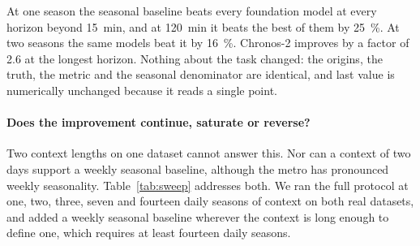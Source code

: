 \documentclass[utf8]{FrontiersinHarvard}
\newif\ifrevisionmarkup
\newcommand{\new}[1]{\ifrevisionmarkup\textcolor{revision}{#1}\else#1\fi}
\newif\ifsecondrevisionmarkup
\newcommand{\rev}[1]{\ifsecondrevisionmarkup\textcolor{revisiontwo}{#1}\else#1\fi}
\theoremstyle{plain}
\theoremstyle{definition}
\theoremstyle{remark}
\begin{document}
At one season the seasonal baseline beats every foundation model at every horizon beyond \SI{15}{\minute}, and at \SI{120}{\minute} it beats the best of them by \SI{25}{\percent}. At two seasons the same models beat it by \SI{16}{\percent}. Chronos-2 improves by a factor of \num{2.6} at the longest horizon. Nothing about the task changed: the origins, the truth, the metric and the seasonal denominator are identical, and last value is numerically unchanged because it reads a single point.

\new{\paragraph{Does the improvement continue, saturate or reverse?} \rev{Two context lengths on one dataset cannot answer this. Nor can a context of two days support a weekly seasonal baseline, although the metro has pronounced weekly seasonality. Table~\ref{tab:sweep} addresses both.} We ran the full protocol at one, two, three, seven and fourteen daily seasons of context on both real datasets, and added a weekly seasonal baseline wherever the context is long enough to define one, which requires at least fourteen daily seasons.}
\end{document}
